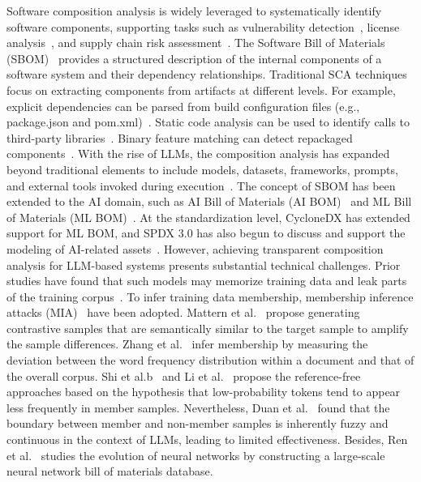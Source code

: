 Software composition analysis is widely leveraged to systematically identify software components, supporting tasks such as vulnerability detection~\cite{zhao2023software, jiang2024binaryai}, license analysis~\cite{german2009license}, and supply chain risk assessment~\cite{Nocera2025SoftwareCA}. The Software Bill of Materials (SBOM)~\cite{yu2024correctness, sehgal2023taxonomy, mirakhorli2024landscape} provides a structured description of the internal components of a software system and their dependency relationships. Traditional SCA techniques focus on extracting components from artifacts at different levels. For example, explicit dependencies can be parsed from build configuration files (e.g., package.json and pom.xml)~\cite{zimmermann2019small, huang2022characterizing}. Static code analysis can be used to identify calls to third-party libraries~\cite{gao2024characterizing}. Binary feature matching can detect repackaged components~\cite{yang2022modx}. With the rise of LLMs, the composition analysis has expanded beyond traditional elements to include models, datasets, frameworks, prompts, and external tools invoked during execution~\cite{wang2025large, huang2024lifting}. 
The concept of SBOM has been extended to the AI domain, such as AI Bill of Materials (AI BOM)~\cite{aibom, bennet2025implementing} and ML Bill of Materials (ML BOM)~\cite{mlbom}. At the standardization level, CycloneDX has extended support for ML BOM, and SPDX 3.0 has also begun to discuss and support the modeling of AI-related assets~\cite{spdx}. However, achieving transparent composition analysis for LLM-based systems presents substantial technical challenges. Prior studies have found that such models may memorize training data and leak parts of the training corpus~\cite{song2019auditing, carlini2021extracting}. To infer training data membership, membership inference attacks (MIA)~\cite{shokri2017membership} have been adopted.
Mattern et al.~\cite{mattern2023membership} propose generating contrastive samples that are semantically similar to the target sample to amplify the sample differences. Zhang et al.~\cite{zhang2024pretraining} infer membership by measuring the deviation between the word frequency distribution within a document and that of the overall corpus. 
Shi et al.b~\cite{shi2023detecting} and Li et al.~\cite{li2025uncovering} propose the reference-free approaches based on the hypothesis that low-probability tokens tend to appear less frequently in member samples. 
Nevertheless, Duan et al.~\cite{duan2024membership} found that the boundary between member and non-member samples is inherently fuzzy and continuous in the context of LLMs, leading to limited effectiveness. Besides, Ren et al.~\cite{ren2025demystifying} studies the evolution of neural networks by constructing a large-scale neural network bill of materials database.






